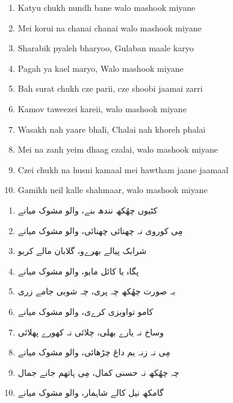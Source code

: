 \documentclass[12pt]{article}
\newcommand{\bigroman}[1]{\fontsize{16pt}{18pt}\selectfont\RaggedRight #1}
\newcommand{\bigarabic}[1]{\fontsize{16pt}{18pt}\selectfont \textarabic{#1}}
\begin{document}
\begin{multicols}{2}
\begin{enumerate}[leftmargin=*, label=\arabic*., font=\fontsize{16pt}{18pt}\selectfont]
  \item \bigroman{Katyu chukh nundh bane walo mashook miyane}
  \item \bigroman{Mei korui na chanai chanai walo mashook miyane}
  \item \bigroman{Sharabik pyaleh bharyoo, Gulaban maale karyo}
  \item \bigroman{Pagah ya kael maryo, Walo mashook miyane}
  \item \bigroman{Bah surat chukh cze parii, cze shoobi jaamai zarri}
  \item \bigroman{Kamov taweezei kareii, walo mashook miyane}
  \item \bigroman{Wasakh nah yaare bhali, Chalai nah khoreh phalai}
  \item \bigroman{Mei na zanh yeim dhaag czalai, walo mashook miyane}
  \item \bigroman{Czei chukh na husni kamaal mei hawtham jaane jaamaal}
  \item \bigroman{Gamikh neil kalle shahmaar, walo mashook miyane}
\end{enumerate}

\columnbreak

\begin{RTL}
\begin{enumerate}[leftmargin=*, label=\arabic*., font=\fontsize{16pt}{18pt}\selectfont]
  \item \bigarabic{کٹیوں چھُکھ نندھ بنے، والو مشوک میانے}
  \item \bigarabic{مِی کوروی نہ چھنائی چھنائی، والو مشوک میانے}
  \item \bigarabic{شرابک پیالے بھرےو، گلابان مالے کریو}
  \item \bigarabic{پگاہ یا کائل مایو، والو مشوک میانے}
  \item \bigarabic{بہ صورت چھُکھ چہ پری، چہ شوبی جامے زری}
  \item \bigarabic{کامو تواویزی کرےی، والو مشوک میانے}
  \item \bigarabic{وساخ نہ یارے بھلی، چلائی نہ کھورے پھلائی}
  \item \bigarabic{مِی نہ زنہ یم داغ چڑھائی، والو مشوک میانے}
  \item \bigarabic{چہ چھُکھ نہ حسنی کمال، مِی ہاتھم جانے جمال}
  \item \bigarabic{گامکھ نیل کالے شاہمار، والو مشوک میانے}
\end{enumerate}
\end{RTL}
\end{multicols}
\end{document}
